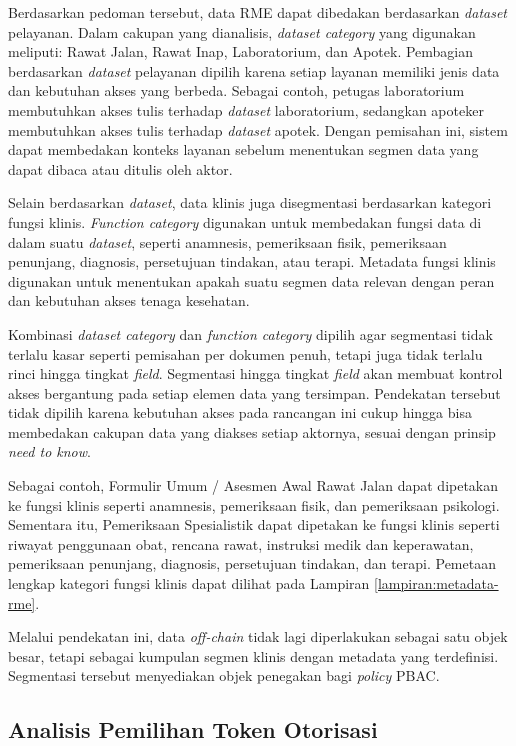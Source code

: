 \documentclass[bahasa, 12pt, a4paper, onecolumn, oneside, final]{report}
\begin{document}
Berdasarkan pedoman tersebut, data RME dapat dibedakan berdasarkan \textit{dataset} pelayanan. Dalam cakupan yang dianalisis, \textit{dataset category} yang digunakan meliputi: Rawat Jalan, Rawat Inap, Laboratorium, dan Apotek. Pembagian berdasarkan \textit{dataset} pelayanan dipilih karena setiap layanan memiliki jenis data dan kebutuhan akses yang berbeda. Sebagai contoh, petugas laboratorium membutuhkan akses tulis terhadap \textit{dataset} laboratorium, sedangkan apoteker membutuhkan akses tulis terhadap \textit{dataset} apotek. Dengan pemisahan ini, sistem dapat membedakan konteks layanan sebelum menentukan segmen data yang dapat dibaca atau ditulis oleh aktor.

Selain berdasarkan \textit{dataset}, data klinis juga disegmentasi berdasarkan kategori fungsi klinis. \textit{Function category} digunakan untuk membedakan fungsi data di dalam suatu \textit{dataset}, seperti anamnesis, pemeriksaan fisik, pemeriksaan penunjang, diagnosis, persetujuan tindakan, atau terapi. Metadata fungsi klinis digunakan untuk menentukan apakah suatu segmen data relevan dengan peran dan kebutuhan akses tenaga kesehatan.

Kombinasi \textit{dataset category} dan \textit{function category} dipilih agar segmentasi tidak terlalu kasar seperti pemisahan per dokumen penuh, tetapi juga tidak terlalu rinci hingga tingkat \textit{field}. Segmentasi hingga tingkat \textit{field} akan membuat kontrol akses bergantung pada setiap elemen data yang tersimpan. Pendekatan tersebut tidak dipilih karena kebutuhan akses pada rancangan ini cukup hingga bisa membedakan cakupan data yang diakses setiap aktornya, sesuai dengan prinsip \textit{need to know}.

Sebagai contoh, Formulir Umum / Asesmen Awal Rawat Jalan dapat dipetakan ke fungsi klinis seperti anamnesis, pemeriksaan fisik, dan pemeriksaan psikologi. Sementara itu, Pemeriksaan Spesialistik dapat dipetakan ke fungsi klinis seperti riwayat penggunaan obat, rencana rawat, instruksi medik dan keperawatan, pemeriksaan penunjang, diagnosis, persetujuan tindakan, dan terapi. Pemetaan lengkap kategori fungsi klinis dapat dilihat pada Lampiran \ref{lampiran:metadata-rme}.

Melalui pendekatan ini, data \textit{off-chain} tidak lagi diperlakukan sebagai satu objek besar, tetapi sebagai kumpulan segmen klinis dengan metadata yang terdefinisi. Segmentasi tersebut menyediakan objek penegakan bagi \textit{policy} PBAC. \subsection{Analisis Pemilihan Token Otorisasi}
\label{subsec:analisis-pemilihan-token-otorisasi}
\end{document}
